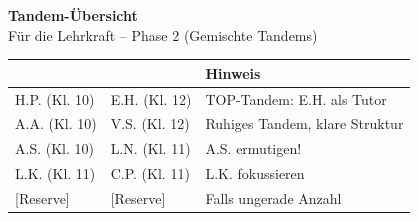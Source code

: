 \documentclass[11pt, a4paper]{article}
\begin{document}
\newpage


\begin{center}
{\LARGE\bfseries Tandem-Übersicht}\\[0.3cm]
{\small Für die Lehrkraft -- Phase 2 (Gemischte Tandems)}
\end{center}

\vspace{1cm}

\begin{center}
\begin{tabular}{|>{\centering\arraybackslash}p{3cm}|>{\centering\arraybackslash}p{3cm}|>{\centering\arraybackslash}p{5cm}|}
\hline
\cellcolor{gruppeA}\textcolor{white}{\textbf{Gruppe A}} & \cellcolor{gruppeB}\textcolor{white}{\textbf{Gruppe B}} & \textbf{Hinweis} \\
\hline
H.P. (Kl. 10) & E.H. (Kl. 12) & TOP-Tandem: E.H. als Tutor \\
\hline
A.A. (Kl. 10) & V.S. (Kl. 12) & Ruhiges Tandem, klare Struktur \\
\hline
A.S. (Kl. 10) & L.N. (Kl. 11) & A.S. ermutigen! \\
\hline
L.K. (Kl. 11) & C.P. (Kl. 11) & L.K. fokussieren \\
\hline
{[Reserve]} & {[Reserve]} & Falls ungerade Anzahl \\
\hline
\end{tabular}
\end{center}

\vspace{1cm}
\end{document}
